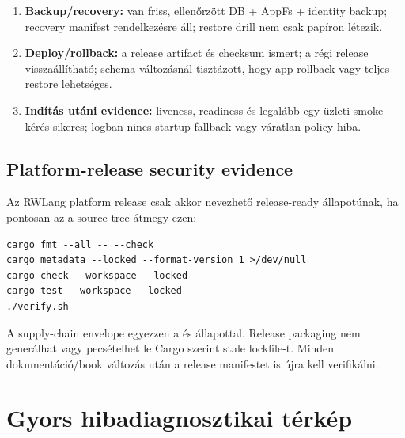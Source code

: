 \begin{enumerate}
  \item \textbf{Backup/recovery:} van friss, ellenőrzött DB + AppFs + identity backup; recovery manifest rendelkezésre áll; restore drill nem csak papíron létezik.
  \item \textbf{Deploy/rollback:} a release artifact és checksum ismert; a régi release visszaállítható; schema-változásnál tisztázott, hogy app rollback vagy teljes restore lehetséges.
  \item \textbf{Indítás utáni evidence:} liveness, readiness és legalább egy üzleti smoke kérés sikeres; logban nincs startup fallback vagy váratlan policy-hiba.
\end{enumerate}

\subsection*{Platform-release security evidence}

Az RWLang platform release csak akkor nevezhető release-ready állapotúnak, ha pontosan az a source tree átmegy ezen:

\begin{lstlisting}
cargo fmt --all -- --check
cargo metadata --locked --format-version 1 >/dev/null
cargo check --workspace --locked
cargo test --workspace --locked
./verify.sh
\end{lstlisting}

A supply-chain envelope egyezzen a  és  állapottal. Release packaging nem generálhat vagy pecsételhet le Cargo szerint stale lockfile-t. Minden dokumentáció/book változás után a release manifestet is újra kell verifikálni.

\section{Gyors hibadiagnosztikai térkép}

